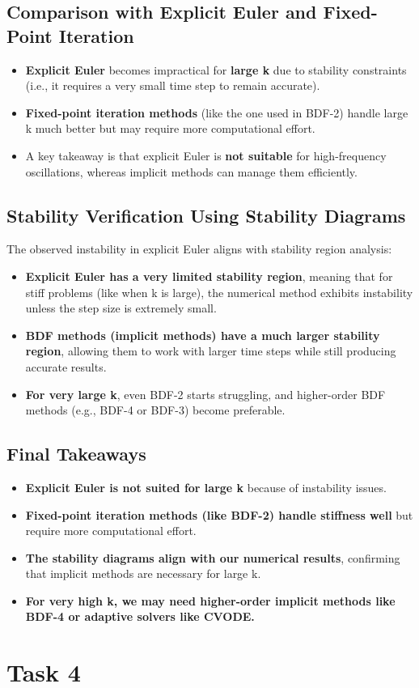 \documentclass{article}
\begin{document}
\subsection{\textbf{Comparison with Explicit Euler and Fixed-Point Iteration}}

\begin{itemize}
    \item \textbf{Explicit Euler} becomes impractical for \textbf{large k} due to stability constraints (i.e., it requires a very small time step to remain accurate).
    \item \textbf{Fixed-point iteration methods} (like the one used in BDF-2) handle large k much better but may require more computational effort.
    \item A key takeaway is that explicit Euler is \textbf{not suitable} for high-frequency oscillations, whereas implicit methods can manage them efficiently.
\end{itemize}

\subsection{\textbf{Stability Verification Using Stability Diagrams}}

The observed instability in explicit Euler aligns with stability region analysis:

\begin{itemize}
    \item \textbf{Explicit Euler has a very limited stability region}, meaning that for stiff problems (like when k is large), the numerical method exhibits instability unless the step size is extremely small.
    \item \textbf{BDF methods (implicit methods) have a much larger stability region}, allowing them to work with larger time steps while still producing accurate results.
    \item \textbf{For very large k}, even BDF-2 starts struggling, and higher-order BDF methods (e.g., BDF-4 or BDF-3) become preferable.
\end{itemize}

\subsection{\textbf{Final Takeaways}}

\begin{itemize}
    \item \textbf{Explicit Euler is not suited for large k} because of instability issues.
    \item \textbf{Fixed-point iteration methods (like BDF-2) handle stiffness well} but require more computational effort.
    \item \textbf{The stability diagrams align with our numerical results}, confirming that implicit methods are necessary for large k.
    \item \textbf{For very high k, we may need higher-order implicit methods like BDF-4 or adaptive solvers like CVODE.}
\end{itemize}

\section{Task 4}

\newpage



\end{document}
